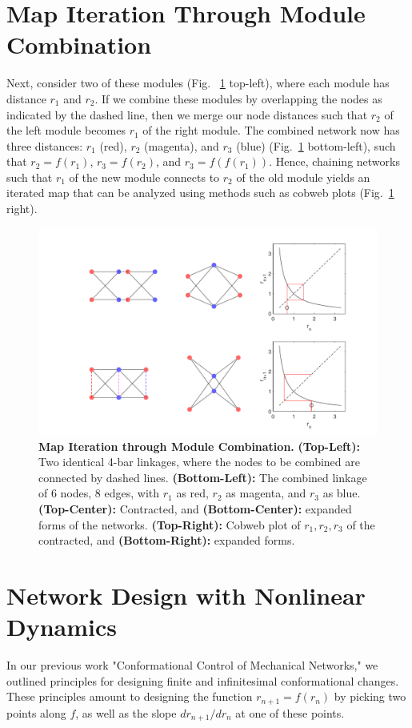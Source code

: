 \documentclass[12pt]{revtex4-1}
\begin{document}
\section{Map Iteration Through Module Combination}
Next, consider two of these modules (Fig.~ \ref{fig:combined} top-left), where each module has distance $r_1$ and $r_2$. If we combine these modules by overlapping the nodes as indicated by the dashed line, then we merge our node distances such that $r_2$ of the left module becomes $r_1$ of the right module. The combined network now has three distances: $r_1$ (red), $r_2$ (magenta), and $r_3$ (blue) (Fig.~\ref{fig:combined} bottom-left), such that $r_2 = f(r_1)$, $r_3 = f(r_2)$, and $r_3 = f(f(r_1))$. Hence, chaining networks such that $r_1$ of the new module connects to $r_2$ of the old module yields an iterated map that can be analyzed using methods such as cobweb plots (Fig.~\ref{fig:combined} right).

\begin{figure}[h!]
	\centering
	\includegraphics[width=1.0\columnwidth]{combined.pdf}
	\caption{\textbf{Map Iteration through Module Combination.} \textbf{(Top-Left):} Two identical 4-bar linkages, where the nodes to be combined are connected by dashed lines. \textbf{(Bottom-Left):} The combined linkage of 6 nodes, 8 edges, with $r_1$ as red, $r_2$ as magenta, and $r_3$ as blue. \textbf{(Top-Center):} Contracted, and \textbf{(Bottom-Center):} expanded forms of the networks. \textbf{(Top-Right):} Cobweb plot of $r_1, r_2, r_3$ of the contracted, and \textbf{(Bottom-Right):} expanded forms.}
	\label{fig:combined}
\end{figure}



\section{Network Design with Nonlinear Dynamics}
In our previous work "Conformational Control of Mechanical Networks," we outlined principles for designing finite and infinitesimal conformational changes. These principles amount to designing the function $r_{n+1} = f(r_n)$ by picking two points along $f$, as well as the slope $dr_{n+1}/dr_n$ at one of these points. 
\end{document}
